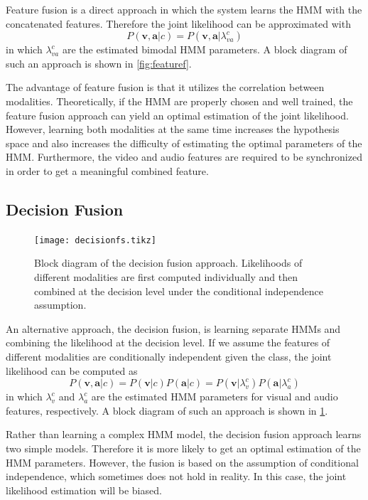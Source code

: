 \documentclass[letterpaper, 10 pt, conference]{ieeeconf}
\begin{document}
Feature fusion is a direct approach in which the system learns the HMM with the concatenated features. Therefore the joint likelihood can be approximated with
\begin{equation}
  P(\mathbf{v},\mathbf{a}|c) = P(\mathbf{v},\mathbf{a}|\lambda_{va}^c)
\end{equation}
in which $\lambda_{va}^c$ are the estimated bimodal HMM parameters. A block diagram of such an approach is shown in \cref{fig:featuref}.

The advantage of feature fusion is that it utilizes the correlation between modalities. Theoretically, if the HMM are properly chosen and well trained, the feature fusion approach can yield an optimal estimation of the joint likelihood. However, learning both modalities at the same time increases the hypothesis space and also increases the difficulty of estimating the optimal parameters of the HMM. Furthermore, the video and audio features are required to be synchronized in order to get a meaningful combined feature.

\subsection{Decision Fusion}
\begin{figure}[t]
  \footnotesize
  \centering
  \texttt{[image: decisionfs.tikz]}
  \caption[Block diagram of the decision fusion approach.]{Block diagram of the decision fusion approach. Likelihoods of different modalities are first computed individually and then combined at the decision level under the conditional independence assumption.}
  \label{fig:decisionf}
\end{figure}

An alternative approach, the decision fusion, is learning separate HMMs and combining the likelihood at the decision level. If we assume the features of different modalities are conditionally independent given the class, the joint likelihood can be computed as
\begin{equation}
  P(\mathbf{v},\mathbf{a}|c) = P(\mathbf{v}|c) P(\mathbf{a}|c) = P(\mathbf{v}|\lambda_v^c) P(\mathbf{a}|\lambda_a^c)
\end{equation}
in which $\lambda_{v}^c$ and $\lambda_{a}^c$ are the estimated HMM parameters for visual and audio features, respectively. A block diagram of such an approach is shown in \cref{fig:decisionf}.

Rather than learning a complex HMM model, the decision fusion approach learns two simple models. Therefore it is more likely to get an optimal estimation of the HMM parameters. However, the fusion is based on the assumption of conditional independence, which sometimes does not hold in reality. In this case, the joint likelihood estimation will be biased.
\end{document}
